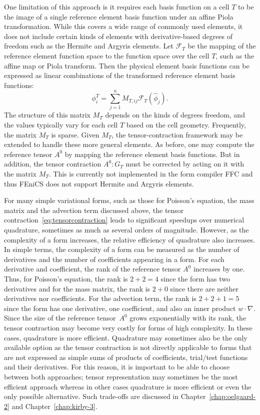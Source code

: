 One limitation of this approach is it requires each basis function on
a cell \( T \) to be the image of a single reference element basis
function under an affine Piola transformation. While this covers a
wide range of commonly used elements, it does not include certain
kinds of elements with derivative-based degrees of freedom such as the
Hermite and Argyris elements. Let \( \mathcal{F}_T \) be the mapping
of the reference element function space to the function space over the
cell $T$, such as the affine map or Piola transform. Then the physical
element basis functions can be expressed as linear combinations of
the transformed reference element basis functions:
\begin{equation}
  \phi^T_i = \sum_{j=1}^n M_{T,{ij}} \mathcal{F}_T \left( \hat{\phi}_j \right).
\end{equation}
The structure of this matrix \( M_T \) depends on the kinds of degrees
freedom, and the values typically vary for each cell \( T \) based on the
cell geometry.  Frequently, the matrix $M_T$ is sparse. Given \( M_T
\), the tensor-contraction framework may be extended to handle these
more general elements.  As before, one may compute the reference
tensor \( A^0 \) by mapping the reference element basis functions. But
in addition, the tensor contraction \( A^0 : G_T \) must be corrected
by acting on it with the matrix \( M_T \). This is currently not
implemented in the form compiler FFC and thus FEniCS does not support
Hermite and Argyris elements.

For many simple variational forms, such as those for Poisson's
equation, the mass matrix and the advection term discussed above, the
tensor contraction~\eqref{eq:tensorcontraction} leads to significant
speedups over numerical quadrature, sometimes as much as several
orders of magnitude.  However, as the complexity of a form increases,
the relative efficiency of quadrature also increases. In simple terms,
the complexity of a form can be measured as the number of derivatives
and the number of coefficients appearing in a form. For each
derivative and coefficient, the rank of the reference tensor $A^0$
increases by one. Thus, for Poisson's equation, the rank is $2 + 2 =
4$ since the form has two derivatives and for the mass matrix, the
rank is $2 + 0$ since there are neither derivatives nor
coefficients. For the advection term, the rank is $2 + 2 + 1 = 5$
since the form has one derivative, one coefficient, and also an inner
product $w \cdot \nabla$. Since the size of the reference tensor~$A^0$
grows exponentially with its rank, the tensor contraction may become
very costly for forms of high complexity. In these cases, quadrature
is more efficient. Quadrature may sometimes also be the only available
option as the tensor contraction is not directly applicable to forms
that are not expressed as simple sums of products of coefficients,
trial/test functions and their derivatives. For this reason, it is
important to be able to choose between both approaches; tensor
representation may sometimes be the most efficient approach whereas in
other cases quadrature is more efficient or even the only possible
alternative.  Such trade-offs are discussed in
Chapter~\ref{chap:oelgaard-2} and Chapter~\ref{chap:kirby-3}.

\endgroup

